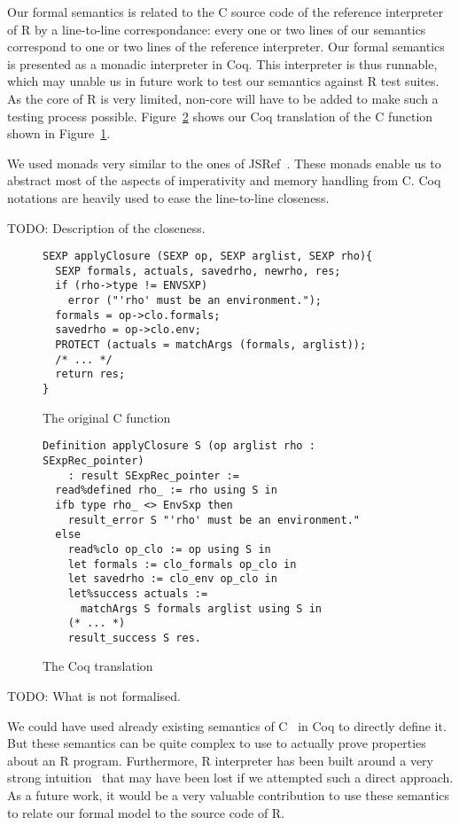 \documentclass[9pt, sigplan, natbib=false, screen=true]{acmart}
\newcommand\Coq{Coq}
\newcommand\R{R}
\newcommand\Cn{C}
\begin{document}
Our formal semantics is related to the \Cn{} source code
of the reference interpreter of \R{}
by a line-to-line correspondance:
every one or two lines of our semantics
correspond to one or two lines of the reference interpreter.
Our formal semantics is presented as a monadic interpreter in \Coq{}.
This interpreter is thus runnable,
which may unable us in future work to test our semantics against
\R{} test suites.
As the core of \R{} is very limited,
non-core will have to be added to make such a testing process possible.
Figure~\ref{fig:coq} shows our \Coq{} translation
of the \Cn{} function shown in Figure~\ref{fig:c}.

We used monads very similar to the ones of JSRef~\parencite{popl14jscert}.
These monads enable us to abstract most of the aspects
of imperativity and memory handling from \Cn{}.
\Coq{} notations are heavily used to ease
the line-to-line closeness.

TODO: Description of the closeness.

\begin{figure}
\begin{verbatim}
SEXP applyClosure (SEXP op, SEXP arglist, SEXP rho){
  SEXP formals, actuals, savedrho, newrho, res;
  if (rho->type != ENVSXP)
    error ("'rho' must be an environment.");
  formals = op->clo.formals;
  savedrho = op->clo.env;
  PROTECT (actuals = matchArgs (formals, arglist));
  /* ... */
  return res;
}
\end{verbatim}
    \caption{The original \Cn{} function}
    \label{fig:c}
\end{figure}

\begin{figure}
\begin{verbatim}
Definition applyClosure S (op arglist rho : SExpRec_pointer)
    : result SExpRec_pointer :=
  read%defined rho_ := rho using S in
  ifb type rho_ <> EnvSxp then
    result_error S "'rho' must be an environment."
  else
    read%clo op_clo := op using S in
    let formals := clo_formals op_clo in
    let savedrho := clo_env op_clo in
    let%success actuals :=
      matchArgs S formals arglist using S in
    (* ... *)
    result_success S res.
\end{verbatim}
    \caption{The \Coq{} translation}
    \label{fig:coq}
\end{figure}

TODO: What is not formalised.

We could have used already existing semantics
of \Cn{}~\parencite{formalin, Leroy-Compcert-CACM} in \Coq{}
to directly define it.
But these semantics can be quite complex to use
to actually prove properties about an \R{} program.
Furthermore, \R{} interpreter has been built
around a very strong intuition~\parencite{ihaka1996r}
that may have been lost if we attempted such a direct approach.
As a future work, it would be a very valuable contribution
to use these semantics to relate
our formal model to the source code of \R{}.
\end{document}
